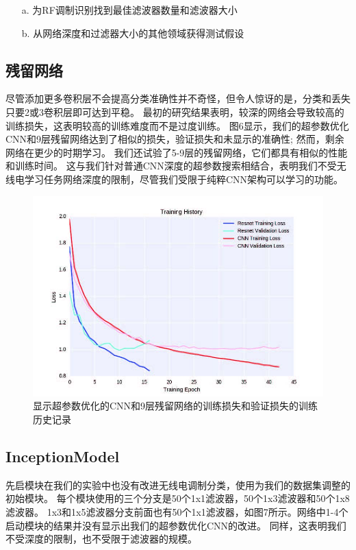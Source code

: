 \begin{enumerate}
	\item[a.] 为RF调制识别找到最佳滤波器数量和滤波器大小
	\item[b.] 从网络深度和过滤器大小的其他领域获得测试假设
\end{enumerate}


\subsection{残留网络}
尽管添加更多卷积层不会提高分类准确性并不奇怪，但令人惊讶的是，分类和丢失只要2或3卷积层即可达到平稳。 最初的研究结果表明，较深的网络会导致较高的训练损失，这表明较高的训练难度而不是过度训练。 图6显示，我们的超参数优化CNN和9层残留网络达到了相似的损失，验证损失和未显示的准确性; 然而，剩余网络在更少的时期学习。 我们还试验了5-9层的残留网络，它们都具有相似的性能和训练时间。 这与我们针对普通CNN深度的超参数搜索相结合，表明我们不受无线电学习任务网络深度的限制，尽管我们受限于纯粹CNN架构可以学习的功能。\par

\begin{figure}[!h]
	\centering
	\includegraphics[scale=1]{figures/chapter_5/fig4}
	\caption{显示超参数优化的CNN和9层残留网络的训练损失和验证损失的训练历史记录}
\end{figure}
\par

\subsection{InceptionModel}
先启模块在我们的实验中也没有改进无线电调制分类，使用为我们的数据集调整的初始模块。 每个模块使用的三个分支是50个1x1滤波器，50个1x3滤波器和50个1x8滤波器。 1x3和1x5滤波器分支前面也有50个1x1滤波器，如图7所示。网络中1-4个启动模块的结果并没有显示出我们的超参数优化CNN的改进。 同样，这表明我们不受深度的限制，也不受限于滤波器的规模。\par

